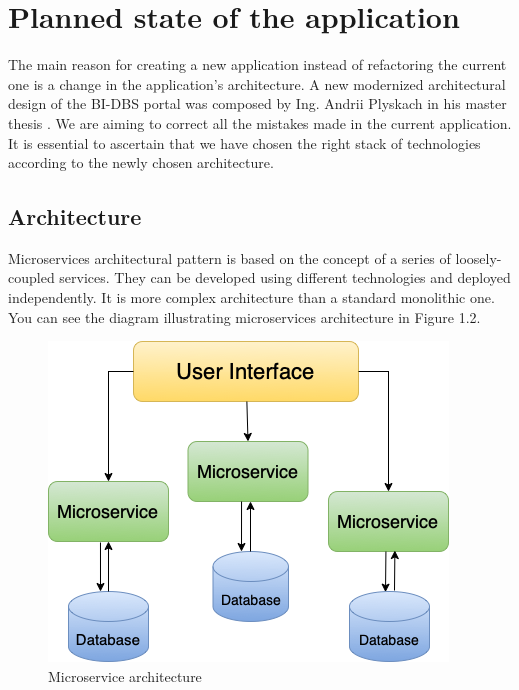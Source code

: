 \section{Planned state of the application} The main reason for creating a new application instead of refactoring the current one is a change in the application's architecture. A new modernized architectural design of the BI-DBS portal was composed by Ing. Andrii Plyskach in his master thesis \cite{mt-plyskach}. We are aiming to correct all the mistakes made in the current application. It is essential to ascertain that we have chosen the right stack of technologies according to the newly chosen architecture.

\subsection{Architecture}
Microservices architectural pattern \cite{architecture-haris} is based on the concept of a series of loosely-coupled services. They can be developed using different technologies and deployed independently. It is more complex architecture than a standard monolithic one. You can see the diagram illustrating microservices architecture in Figure 1.2. 

\begin{figure}[hp]
\centering
\includegraphics[scale=0.67]{../png/microservices.png}
\caption{Microservice architecture}\label{picture:microservices}
\end{figure}


